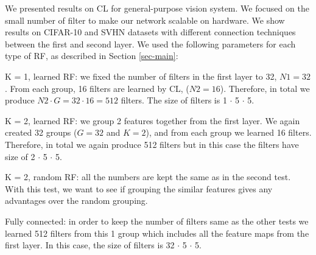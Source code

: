 \documentclass{article} %
\begin{document}
We presented results on CL for general-purpose vision system. We focused on the small number of filter to make our network scalable on hardware. We show results on CIFAR-10 and SVHN datasets with different connection techniques between the first and second layer.  We used the following parameters for each type of RF, as described in Section \ref{sec-main}:

K = 1, learned RF: we fixed the number of filters in the first layer to 32, $N1=32$. From each group, 16 filters are learned by CL, ($N2 = 16$). Therefore, in total we produce $N2 \cdot G = 32 \cdot 16 = 512$ filters. The size of filters is 1 $\cdot$ 5 $\cdot$ 5. 

K = 2, learned RF: we group 2 features together from the first layer. We again created 32 groups ($G = 32$ and $K = 2$), and from each group we learned 16 filters. Therefore, in total we again produce 512 filters but in this case the filters have size of 2 $\cdot$ 5 $\cdot$ 5. 

K = 2, random RF: all the numbers are kept the same as in the second test. With this test, we want to see if grouping the similar features gives any advantages over the random grouping.

Fully connected: in order to keep the number of filters same as the other tests we learned 512 filters from this 1 group which includes all the feature maps from the first layer. In this case, the size of filters is 32 $\cdot$ 5 $\cdot$ 5. 
\end{document}
